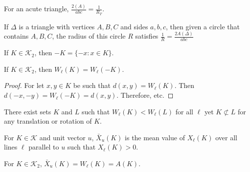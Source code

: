 \documentclass[crop=false,class=article,oneside]{standalone}
\begin{document}
        \begin{theorem}
        For an acute triangle, $\frac{2(A)}{abc} = \frac{1}{R_T}$.
        \end{theorem}
        \begin{theorem}
        If $\Delta$ is a triangle with vertices $A,B,C$ and sides $a,b,c$, then given a circle that contains $A,B,C$, the radius of this circle $R$ satisfies $\frac{1}{R} =\frac{2A(\Delta)}{abc}$
        \end{theorem}
        \begin{definition}
        If $K\in \mathscr{K}_2$, then $-K = \{-x:x\in K\}$.
        \end{definition}
        \begin{theorem}
        If $K\in \mathscr{K}_2$, then $W_{\ell}(K) = W_{\ell}(-K)$.
        \end{theorem}
        \begin{proof}
        For let $x,y\in K$ be such that $d(x,y) = W_{\ell}(K)$. Then $d(-x,-y) = W_{\ell}(-K) = d(x,y)$. Therefore, etc.
        \end{proof}
        \begin{theorem}
        There exist sets $K$ and $L$ such that $W_{\ell}(K)<W_{\ell}(L)$ for all $\ell$ yet $K\not\subset L$ for any translation or rotation of $K$.
        \end{theorem}
        \begin{definition}
        For $K\in \mathscr{K}$ and unit vector $u$, $\bar{X}_{u}(K)$ is the mean value of $X_{\ell}(K)$ over all lines $\ell$ parallel to $u$ such that $X_{\ell}(K)>0$.
        \end{definition}
        \begin{theorem}
        For $K\in \mathscr{K}_2$, $\bar{X}_{u}(K) = W_{\ell}(K)=A(K)$.
        \end{theorem}
\end{document}
